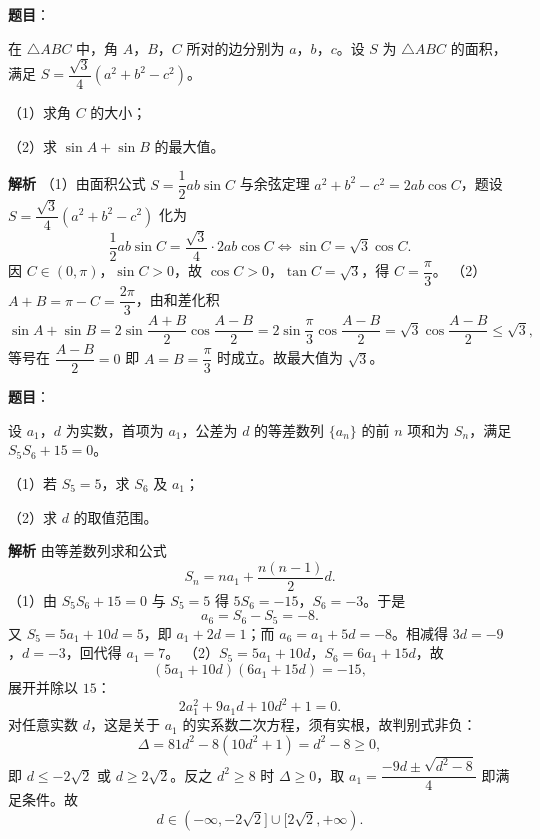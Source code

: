 \begin{answer}

\textbf{题目}：

在 $\triangle ABC$ 中，角 $A$，$B$，$C$ 所对的边分别为 $a$，$b$，$c$。设 $S$ 为 $\triangle ABC$ 的面积，满足 $S=\dfrac{\sqrt3}{4}(a^2+b^2-c^2)$。

（1）求角 $C$ 的大小；

（2）求 $\sin A+\sin B$ 的最大值。

\textbf{解析}
（1）由面积公式 $S=\dfrac12ab\sin C$ 与余弦定理 $a^2+b^2-c^2=2ab\cos C$，题设 $S=\dfrac{\sqrt3}4(a^2+b^2-c^2)$ 化为
\nopagebreak[4]
\[\frac12ab\sin C=\frac{\sqrt3}4\cdot2ab\cos C\iff\sin C=\sqrt3\cos C.\]
因 $C\in(0,\pi)$，$\sin C>0$，故 $\cos C>0$，$\tan C=\sqrt3$，得 $C=\dfrac\pi3$。
（2）$A+B=\pi-C=\dfrac{2\pi}3$，由和差化积
\nopagebreak[4]
\[\sin A+\sin B=2\sin\frac{A+B}2\cos\frac{A-B}2
=2\sin\frac\pi3\cos\frac{A-B}2=\sqrt3\cos\frac{A-B}2\leqslant\sqrt3,\]
等号在 $\dfrac{A-B}2=0$ 即 $A=B=\dfrac\pi3$ 时成立。故最大值为 $\sqrt3$。


\end{answer}
\begin{answer}

\textbf{题目}：

设 $a_1$，$d$ 为实数，首项为 $a_1$，公差为 $d$ 的等差数列 $\{a_n\}$ 的前 $n$ 项和为 $S_n$，满足 $S_5S_6+15=0$。

（1）若 $S_5=5$，求 $S_6$ 及 $a_1$；

（2）求 $d$ 的取值范围。

\textbf{解析}
由等差数列求和公式
\nopagebreak[4]
\[S_n=na_1+\frac{n(n-1)}2d.\]
（1）由 $S_5S_6+15=0$ 与 $S_5=5$ 得 $5S_6=-15$，$S_6=-3$。于是
\nopagebreak[4]
\[a_6=S_6-S_5=-8.\]
又 $S_5=5a_1+10d=5$，即 $a_1+2d=1$；而 $a_6=a_1+5d=-8$。相减得 $3d=-9$，$d=-3$，回代得 $a_1=7$。
（2）$S_5=5a_1+10d$，$S_6=6a_1+15d$，故
\nopagebreak[4]
\[(5a_1+10d)(6a_1+15d)=-15,\]
展开并除以 $15$：
\nopagebreak[4]
\[2a_1^2+9a_1d+10d^2+1=0.\]
对任意实数 $d$，这是关于 $a_1$ 的实系数二次方程，须有实根，故判别式非负：
\nopagebreak[4]
\[\Delta=81d^2-8\left(10d^2+1\right)=d^2-8\geqslant0,\]
即 $d\leqslant-2\sqrt2$ 或 $d\geqslant2\sqrt2$。反之 $d^2\geqslant8$ 时 $\Delta\geqslant0$，取 $a_1=\dfrac{-9d\pm\sqrt{d^2-8}}4$ 即满足条件。故
\nopagebreak[4]
\[d\in(-\infty,-2\sqrt2]\cup[2\sqrt2,+\infty).\]

\gkanswer{答案：（1）$S_6=-3$，$a_1=7$；（2）$(-\infty,-2\sqrt2]\cup[2\sqrt2,+\infty)$。}

\end{answer}
